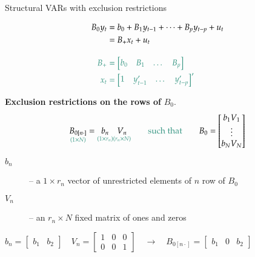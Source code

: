 \documentclass[notes,blackandwhite,mathsans,usenames,dvipsnames]{beamer}
\begin{document}
\begin{frame}{Structural VARs with exclusion restrictions}

\begin{align*}
B_0y_t &= b_0 + B_1y_{t-1}+ \dots + B_py_{t-p} + u_t\\
&= B_+ x_t + u_t\\[2ex]
{\color{mcxs2}B_+} & \;{\color{mcxs2}= \begin{bmatrix} b_0 & B_1 & \dots & B_p \end{bmatrix}}\\
{\color{mcxs2}x_t} &\;{\color{mcxs2}= \begin{bmatrix} 1 & y_{t-1}' & \dots & y_{t-p}' \end{bmatrix}'}
\end{align*}

\bigskip\normalsize\textbf{Exclusion restrictions on the rows of} $B_0$.
$$
\underset{\color{mcxs2}(1\times N)}{B_{0[n\cdot]}} = \underset{\color{mcxs2}(1\times r_n)}{b_n} \underset{\color{mcxs2}(r_n\times N)}{V_n} \qquad\text{\color{mcxs2}such that}\qquad
B_0 = \begin{bmatrix} b_1V_1\\ \vdots \\ b_NV_N \end{bmatrix}
$$
\begin{description}
\item[$b_n$] {\color{mcxs2}-- a $1\times r_n$ vector of unrestricted elements of $n$ row of $B_0$}
\item[$V_n$] {\color{mcxs2}-- an $r_n\times N$ {\color{purple}fixed} matrix of ones and zeros}
\end{description}

 \small
$
b_n = \begin{bmatrix} b_1 & b_2\end{bmatrix}\quad V_n = \begin{bmatrix} 1&0&0\\0&0&1\end{bmatrix} \quad\rightarrow\quad B_{0[n\cdot]} = \begin{bmatrix} b_1&0 & b_2\end{bmatrix}
$

\end{frame}
\end{document}
